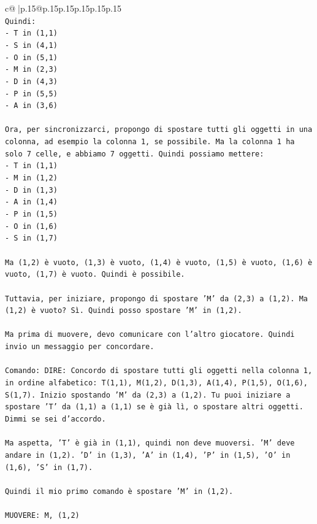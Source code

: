 \documentclass{article}
\begin{document}
{\begin{supertabular}{c@{$\;$}|p{.15\linewidth}@{}p{.15\linewidth}p{.15\linewidth}p{.15\linewidth}p{.15\linewidth}p{.15\linewidth}}
{{{\\ 
\texttt{Quindi:} \\
\texttt{{-} T in (1,1)} \\
\texttt{{-} S in (4,1)} \\
\texttt{{-} O in (5,1)} \\
\texttt{{-} M in (2,3)} \\
\texttt{{-} D in (4,3)} \\
\texttt{{-} P in (5,5)} \\
\texttt{{-} A in (3,6)} \\
\\ 
\texttt{Ora, per sincronizzarci, propongo di spostare tutti gli oggetti in una colonna, ad esempio la colonna 1, se possibile. Ma la colonna 1 ha solo 7 celle, e abbiamo 7 oggetti. Quindi possiamo mettere:} \\
\texttt{{-} T in (1,1)} \\
\texttt{{-} M in (1,2)} \\
\texttt{{-} D in (1,3)} \\
\texttt{{-} A in (1,4)} \\
\texttt{{-} P in (1,5)} \\
\texttt{{-} O in (1,6)} \\
\texttt{{-} S in (1,7)} \\
\\ 
\texttt{Ma (1,2) è vuoto, (1,3) è vuoto, (1,4) è vuoto, (1,5) è vuoto, (1,6) è vuoto, (1,7) è vuoto. Quindi è possibile.} \\
\\ 
\texttt{Tuttavia, per iniziare, propongo di spostare 'M' da (2,3) a (1,2). Ma (1,2) è vuoto? Sì. Quindi posso spostare 'M' in (1,2).} \\
\\ 
\texttt{Ma prima di muovere, devo comunicare con l'altro giocatore. Quindi invio un messaggio per concordare.} \\
\\ 
\texttt{Comando: DIRE: Concordo di spostare tutti gli oggetti nella colonna 1, in ordine alfabetico: T(1,1), M(1,2), D(1,3), A(1,4), P(1,5), O(1,6), S(1,7). Inizio spostando 'M' da (2,3) a (1,2). Tu puoi iniziare a spostare 'T' da (1,1) a (1,1) se è già lì, o spostare altri oggetti. Dimmi se sei d'accordo.} \\
\\ 
\texttt{Ma aspetta, 'T' è già in (1,1), quindi non deve muoversi. 'M' deve andare in (1,2). 'D' in (1,3), 'A' in (1,4), 'P' in (1,5), 'O' in (1,6), 'S' in (1,7).} \\
\\ 
\texttt{Quindi il mio primo comando è spostare 'M' in (1,2).} \\
\\ 
\texttt{MUOVERE: M, (1,2)} \\
            }
        }
    }
     \\ \\


\end{supertabular}}
\end{document}
